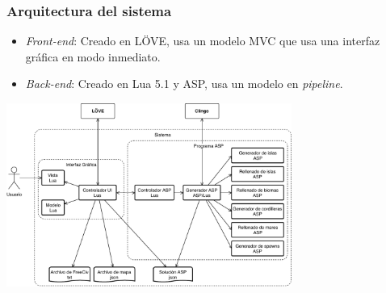 \begin{frame}
\frametitle{Arquitectura del sistema}

\begin{itemize}
	\item<1-> \textcolor{UDCpink}{\itshape Front-end}: Creado en LÖVE, usa un modelo MVC que usa una interfaz gráfica en modo inmediato.
	
	\vspace{0.5em}
	
	\item<2-> \textcolor{UDCpink}{\itshape Back-end}: Creado en Lua 5.1 y ASP, usa un modelo en \textit{pipeline}.
	
\end{itemize}

\vspace{0.5em}

\pause[3]

\begin{center}
	\includegraphics[width=0.7\textwidth]{images/arquitectura-completa.pdf}
\end{center}

\end{frame}

